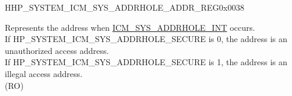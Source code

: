 \begin{register}{H}{HP\_SYSTEM\_ICM\_SYS\_ADDRHOLE\_ADDR\_REG}{0x0038}\label{regdesc:HPSYSTEMICMSYSADDRHOLEADDRREG}
%
\regnewline%
\begin{regdesc}\begin{reglist}
\label{fielddesc:HPSYSTEMICMSYSADDRHOLEADDR}\item [HP\_SYSTEM\_ICM\_SYS\_ADDRHOLE\_ADDR] Represents the address when \hyperref[tab:sysreg-int-sources]{ICM\_SYS\_ADDRHOLE\_INT} occurs.\\
If HP\_SYSTEM\_ICM\_SYS\_ADDRHOLE\_SECURE is 0, the address is an unauthorized access address.\\
If HP\_SYSTEM\_ICM\_SYS\_ADDRHOLE\_SECURE is 1, the address is an illegal access address.\\
(RO)
\end{reglist}\end{regdesc}
\end{register}


